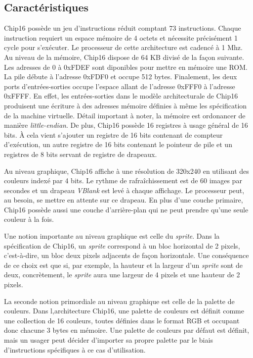 \documentclass{article} %
\begin{document}
\subsection{Caractéristiques}
Chip16 possède un jeu d'instructions réduit comptant 73 instructions. Chaque instruction requiert un espace mémoire de 4 octets et nécessite précisément 1 cycle pour s'exécuter. Le processeur de cette architecture est cadencé à 1 Mhz. Au niveau de la mémoire, Chip16 dispose de 64 KB divisé de la façon suivante. Les adresses de 0 à 0xFDEF sont diponibles pour mettre en mémoire une ROM. La pile débute à l'adresse 0xFDF0 et occupe 512 bytes. Finalement, les deux ports d'entrées-sorties occupe l'espace allant de l'adresse 0xFFF0 à l'adresse 0xFFFF. En effet, les entrées-sorties dans le modèle architecturale de Chip16 produisent une écriture à des adresses mémoire définies à même les spécification de la machine virtuelle. Détail important à noter, la mémoire est ordonancer de manière \textit{little-endian}. De plus, Chip16 possède 16 registres à usage général de 16 bits. À cela vient s'ajouter un registre de 16 bits contenant de compteur d'exécution, un autre registre de 16 bits contenant le  pointeur de pile et un registres de 8 bits servant de registre de drapeaux. 

Au niveau graphique, Chip16 affiche à une résolution de 320x240 en utilisant des couleurs indexé par 4 bits. Le rythme de rafraîchissement est de 60 images par secondes et un drapeau \textit{VBlank} est levé à chaque affichage. Le processeur peut, au besoin, se mettre en attente sur ce drapeau. En plus d'une couche primaire, Chip16 possède aussi une couche d'arrière-plan qui ne peut prendre qu'une seule couleur à la fois. 

Une notion importante au niveau graphique est celle du \textit{sprite}. Dans la spécification de Chip16, un \textit{sprite} correspond à un bloc horizontal de 2 pixels, c'est-à-dire, un bloc deux pixels adjacents de façon horizontale. Une conséquence de ce choix est que si, par exemple, la hauteur et la largeur d'un \textit{sprite} sont de deux, concrètement, le \textit{sprite} aura une largeur de 4 pixels et une hauteur de 2 pixels.

La seconde notion primordiale au niveau graphique est celle de la palette de couleurs. Dans l,architecture Chip16, une palette de couleurs est définit comme une collection de 16 couleurs, toutes définies dans le format RGB et occupant donc chacune 3 bytes en mémoire. Une palette de couleurs par défaut est définit, mais un usager peut décider d'importer sa propre palette par le biais d'instructions spécifiques à ce cas d'utilisation.
\end{document}

